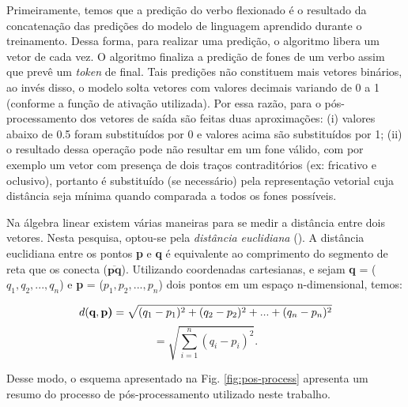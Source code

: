 Primeiramente, temos que a predição do verbo flexionado é o resultado da concatenação das predições do modelo de linguagem aprendido durante o treinamento. Dessa forma, para realizar uma predição, o algoritmo libera um vetor de cada vez. O algoritmo finaliza a predição de fones de um verbo assim que prevê um \textit{token} de final. Tais predições não constituem mais vetores binários, ao invés disso, o modelo solta vetores com valores decimais variando de 0 a 1 (conforme a função de ativação utilizada). Por essa razão, para o pós-processamento dos vetores de saída são feitas duas aproximações: (i) valores abaixo de 0.5 foram substituídos por 0 e valores acima são substituídos por 1; (ii) o resultado dessa operação pode não resultar em um fone válido, com por exemplo um vetor com presença de dois traços contraditórios (ex: fricativo e oclusivo), portanto é substituído (se necessário) pela representação vetorial cuja distância seja mínima quando comparada a todos os fones possíveis. 

Na álgebra linear existem várias maneiras para se medir a distância entre dois vetores. Nesta pesquisa, optou-se pela \textit{distância euclidiana} (\cite{boulos2009geometria}). A distância euclidiana entre os pontos \textbf{p} e \textbf{q} é equivalente ao comprimento do segmento de reta que os conecta (${\displaystyle {\overline {\mathbf {p} \mathbf {q} }}}$). Utilizando coordenadas cartesianas, e sejam \textbf{q} = ($q_1, q_2, ..., q_n$) e \textbf{p} = ($p_1, p_2, ..., p_n$) dois pontos em um espaço n-dimensional, temos:

\begin{equation}
    d(\textbf{q}, \textbf{p)} = \sqrt{(q_1 - p_1)^2 + (q_2 - p_2)^2 + ... + (q_n - p_n)^2}\notag
\end{equation}
\begin{equation}
    = \sqrt{\sum_{i=1}^n (q_i-p_i)^2}.    
\end{equation}

Desse modo, o esquema apresentado na Fig. \ref{fig:pos-process} apresenta um resumo do processo de pós-processamento utilizado neste trabalho.


 



